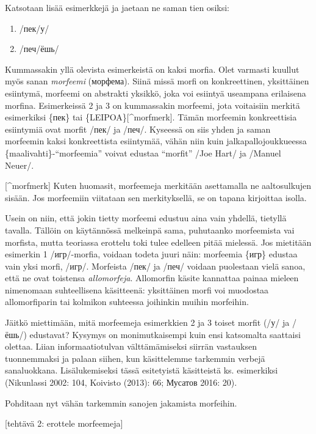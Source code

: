 Katsotaan lisää esimerkkejä ja jaetaan ne saman tien osiksi:

\begin{enumerate}
\def\labelenumi{(\arabic{enumi})}
\setcounter{enumi}{1}
\itemsep1pt\parskip0pt
\item
  /пек/у/
\item
  /печ/ёшь/
\end{enumerate}

Kummassakin yllä olevista esimerkeistä on kaksi morfia. Olet varmasti
kuullut myös sanan \emph{morfeemi} (морфема). Siinä missä morfi on
konkreettinen, yksittäinen esiintymä, morfeemi on abstrakti yksikkö,
joka voi esiintyä useampana erilaisena morfina. Esimerkeissä 2 ja 3 on
kummassakin morfeemi, jota voitaisiin merkitä esimerkiksi \{пек\} tai
\{LEIPOA\}{[}\^{}morfmerk{]}. Tämän morfeemin konkreettisia esiintymiä
ovat morfit /пек/ ja /печ/. Kyseessä on siis yhden ja saman morfeemin
kaksi konkreettista esiintymää, vähän niin kuin jalkapallojoukkueessa
\{maalivahti\}-``morfeemia'' voivat edustaa ``morfit'' /Joe Hart/ ja
/Manuel Neuer/.

{[}\^{}morfmerk{]} Kuten huomasit, morfeemeja merkitään asettamalla ne
aaltosulkujen sisään. Jos morfeemiin viitataan sen merkityksellä, se on
tapana kirjoittaa isolla.

Usein on niin, että jokin tietty morfeemi edustuu aina vain yhdellä,
tietyllä tavalla. Tällöin on käytännössä melkeinpä sama, puhutaanko
morfeemista vai morfista, mutta teoriassa erottelu toki tulee edelleen
pitää mielessä. Jos mietitään esimerkin 1 /игр/-morfia, voidaan todeta
juuri näin: morfeemia \{игр\} edustaa vain yksi morfi, /игр/. Morfeista
/пек/ ja /печ/ voidaan puolestaan vielä sanoa, että ne ovat toistensa
\emph{allomorfeja}. Allomorfin käsite kannattaa painaa mieleen
nimenomaan suhteellisena käsitteenä: yksittäinen morfi voi muodostaa
allomorfiparin tai kolmikon suhteessa joihinkin muihin morfeihin.

Jäitkö miettimään, mitä morfeemeja esimerkkien 2 ja 3 toiset morfit (/у/
ja /ёшь/) edustavat? Kysymys on monimutkaisempi kuin ensi katsomalta
saattaisi olettaa. Liian informaatiotulvan välttämämiseksi siirrän
vastauksen tuonnemmaksi ja palaan siihen, kun käsittelemme tarkemmin
verbejä sanaluokkana. Lisälukemiseksi tässä esitetyistä käsitteistä ks.
esimerkiksi (Nikunlassi 2002: 104, Koivisto (2013): 66; Мусатов 2016:
20).

Pohditaan nyt vähän tarkemmin sanojen jakamista morfeihin.

{[}tehtävä 2: erottele morfeemeja{]}

